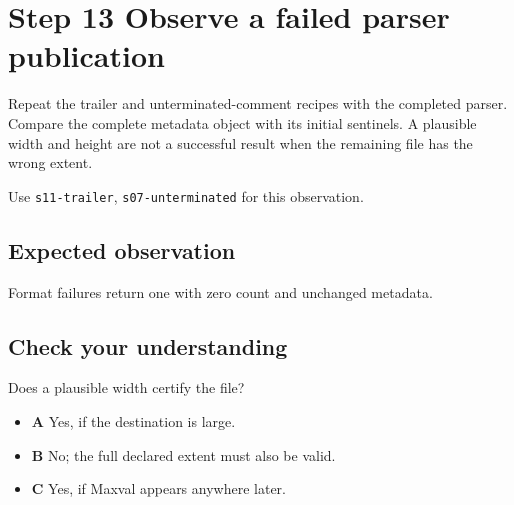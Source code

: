 \section{Step 13 Observe a failed parser publication}\label{ppm-s13}

Repeat the trailer and unterminated-comment recipes with the completed parser. Compare the complete metadata object with its initial sentinels. A plausible width and height are not a successful result when the remaining file has the wrong extent.

Use \texttt{s11-trailer}, \texttt{s07-unterminated} for this observation.

\subsection{Expected observation}
Format failures return one with zero count and unchanged metadata.

\subsection{Check your understanding}
Does a plausible width certify the file?

\begin{itemize}
  \item \textbf{A} Yes, if the destination is large.
  \item \textbf{B} No; the full declared extent must also be valid.
  \item \textbf{C} Yes, if Maxval appears anywhere later.
\end{itemize}
